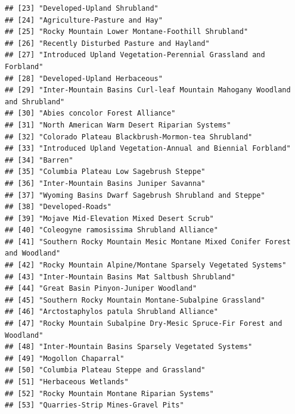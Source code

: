 \documentclass[]{book}
\begin{document}
\begin{verbatim}
## [23] "Developed-Upland Shrubland"                                                 
## [24] "Agriculture-Pasture and Hay"                                                
## [25] "Rocky Mountain Lower Montane-Foothill Shrubland"                            
## [26] "Recently Disturbed Pasture and Hayland"                                     
## [27] "Introduced Upland Vegetation-Perennial Grassland and Forbland"              
## [28] "Developed-Upland Herbaceous"                                                
## [29] "Inter-Mountain Basins Curl-leaf Mountain Mahogany Woodland and Shrubland"   
## [30] "Abies concolor Forest Alliance"                                             
## [31] "North American Warm Desert Riparian Systems"                                
## [32] "Colorado Plateau Blackbrush-Mormon-tea Shrubland"                           
## [33] "Introduced Upland Vegetation-Annual and Biennial Forbland"                  
## [34] "Barren"                                                                     
## [35] "Columbia Plateau Low Sagebrush Steppe"                                      
## [36] "Inter-Mountain Basins Juniper Savanna"                                      
## [37] "Wyoming Basins Dwarf Sagebrush Shrubland and Steppe"                        
## [38] "Developed-Roads"                                                            
## [39] "Mojave Mid-Elevation Mixed Desert Scrub"                                    
## [40] "Coleogyne ramosissima Shrubland Alliance"                                   
## [41] "Southern Rocky Mountain Mesic Montane Mixed Conifer Forest and Woodland"    
## [42] "Rocky Mountain Alpine/Montane Sparsely Vegetated Systems"                   
## [43] "Inter-Mountain Basins Mat Saltbush Shrubland"                               
## [44] "Great Basin Pinyon-Juniper Woodland"                                        
## [45] "Southern Rocky Mountain Montane-Subalpine Grassland"                        
## [46] "Arctostaphylos patula Shrubland Alliance"                                   
## [47] "Rocky Mountain Subalpine Dry-Mesic Spruce-Fir Forest and Woodland"          
## [48] "Inter-Mountain Basins Sparsely Vegetated Systems"                           
## [49] "Mogollon Chaparral"                                                         
## [50] "Columbia Plateau Steppe and Grassland"                                      
## [51] "Herbaceous Wetlands"                                                        
## [52] "Rocky Mountain Montane Riparian Systems"                                    
## [53] "Quarries-Strip Mines-Gravel Pits"                                           

\end{verbatim}
\end{document}

